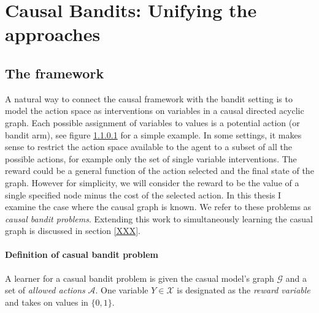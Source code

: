\documentclass[11pt,a4paper,oneside]{book}
\theoremstyle{plain}
\theoremstyle{definition}
\begin{document}
\chapter{Causal Bandits: Unifying the approaches}

\section{The framework}
A natural way to connect the causal framework with the bandit setting is to model the action space as interventions on variables in a causal directed acyclic graph. Each possible assignment of variables to values is a potential action (or bandit arm), see figure \ref{} for a simple example. In some settings, it makes sense to restrict the action space available to the agent to a subset of all the possible actions, for example only the set of single variable interventions. The reward could be a general function of the action selected and the final state of the graph. However for simplicity, we will consider the reward to be the value of a single specified node minus the cost of the selected action. In this thesis I examine the case where the causal graph is known. We refer to these problems as \emph{causal bandit problems}.  Extending this work to simultaneously learning the casual graph is discussed in section \ref{XXX}.

\subsubsection{Definition of casual bandit problem} 
A learner for a casual bandit problem is given the casual model's graph $\mathcal{G}$ and a set of \emph{allowed actions} $\mathcal{A}$.
One variable $Y \in \mathcal{X}$ is designated as the \emph{reward variable} and takes on values in $\{0, 1\}$.
\end{document}
